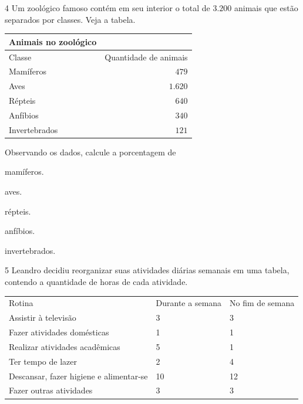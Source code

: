 \num{4}  Um zoológico famoso contém em seu interior o total de $3.200$ animais
que estão separados por classes. Veja a tabela.

\begin{table}[h]\centering
\begin{tabular}[]{lr}
\toprule
Animais no zoológico &\\
\midrule
Classe & Quantidade de animais\\
Mamíferos & $479$\\
Aves & $1.620$\\
Répteis & $640$\\
Anfíbios & $340$\\
Invertebrados & $121$\\
\bottomrule
\end{tabular}
\end{table}

Observando os dados, calcule a porcentagem de

\begin{escolha}
\item mamíferos.\\

\item aves.\\

\item répteis.\\

\item anfíbios.\\

\item invertebrados.\\

\end{escolha}

\num{5}  Leandro decidiu reorganizar suas atividades diárias semanais em uma
tabela, contendo a quantidade de horas de cada atividade.

\begin{table}[H]\centering
\begin{tabular}{lll}
Rotina                                  & Durante a semana & No fim de semana \\
Assistir à televisão                    & 3                & 3                \\
Fazer atividades domésticas             & 1                & 1                \\
Realizar atividades acadêmicas          & 5                & 1                \\
Ter tempo de lazer                      & 2                & 4                \\
Descansar, fazer higiene e alimentar-se & 10               & 12               \\
Fazer outras atividades                 & 3                & 3               
\end{tabular}
\end{table}

